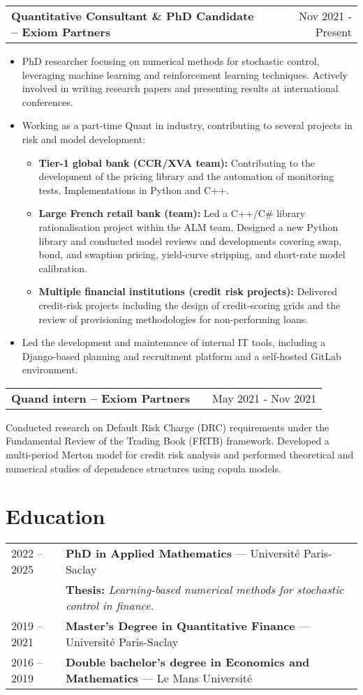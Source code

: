 \documentclass[a4paper,12pt]{article}
\makeatletter
\newenvironment{jobshort}[2]
    {
    \begin{tabularx}{\linewidth}{@{}l X r@{}}
    \textbf{#1} & \hfill &  #2 \\[3.75pt]
    \end{tabularx}
    }
    {
    }
\newenvironment{joblong}[2]
    {
    \begin{tabularx}{\linewidth}{@{}l X r@{}}
    \textbf{#1} & \hfill &  #2 \\[3.75pt]
    \end{tabularx}
    \begin{minipage}[t]{\linewidth}
    \begin{itemize}[nosep,after=\strut, leftmargin=1em, itemsep=3pt,label=--]
    }
    {
    \end{itemize}
    \end{minipage}    
    }
\makeatother
\begin{document}
	\begin{joblong}{Quantitative Consultant \& PhD Candidate -- Exiom Partners}{Nov 2021 - Present}
	\item PhD researcher focusing on numerical methods for stochastic control, leveraging machine learning and reinforcement learning techniques. Actively involved in writing research papers and presenting results at international conferences.
	\item Working as a part-time Quant in industry, contributing to several projects in risk and model development:
		\begin{itemize}
			\item \textbf{Tier-1 global bank (CCR/XVA team):} Contributing to the development of the pricing library and the automation of monitoring tests. Implementations in Python and C++.
			\item \textbf{Large French retail bank (team):} Led a C++/C\# library rationalisation project within the ALM team. Designed a new Python library and conducted model reviews and developments covering swap, bond, and swaption pricing, yield-curve stripping, and short-rate model calibration.
			\item \textbf{Multiple financial institutions (credit risk projects):} Delivered credit-risk projects including the design of credit-scoring grids and the review of provisioning methodologies for non-performing loans.
		\end{itemize}
	\item Led the development and maintenance of internal IT tools, including a Django-based planning and recruitment platform and a self-hosted GitLab environment.
	\end{joblong}

	\begin{jobshort}{Quand intern -- Exiom Partners}{May 2021 - Nov 2021}
	Conducted research on Default Risk Charge (DRC) requirements under the Fundamental Review of the Trading Book (FRTB) framework.
	Developed a multi-period Merton model for credit risk analysis and performed theoretical and numerical studies of dependence structures using copula models.
	\end{jobshort}

	\section{Education}
	\begin{tabularx}{\linewidth}{@{}l X@{}}	
		2022 -- 2025 & \textbf{PhD in Applied Mathematics} — Université Paris-Saclay \\
		& \textbf{Thesis:} \textit{Learning-based numerical methods for stochastic control in finance.} \\
		2019 -- 2021 & \textbf{Master’s Degree in Quantitative Finance} — Université Paris-Saclay \\
		2016 -- 2019 & \textbf{Double bachelor’s degree in Economics and Mathematics} — Le Mans Université
	\end{tabularx}
\end{document}

